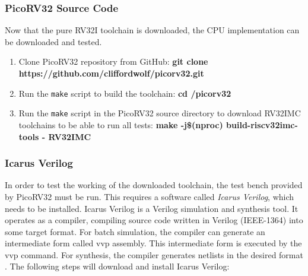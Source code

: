 \subsubsection{PicoRV32 Source Code}
 \label{sect6_3_2_2}
Now that the pure RV32I toolchain is downloaded, the CPU implementation can be downloaded and tested.

\begin{enumerate}
\item Clone PicoRV32 repository from GitHub: \newline
\small \textbf{git clone https://github.com/cliffordwolf/picorv32.git}

\item Run the \verb|make| script to build the toolchain:\newline
\small \textbf{cd \texttildelow /picorv32}

\item Run the \verb|make| script in the PicoRV32 source directory to download RV32IMC toolchains to be able to run all tests:\newline
\small \textbf{make -j\$(nproc) build-riscv32imc-tools - RV32IMC}

\end{enumerate}

\subsubsection{Icarus Verilog}
\label{sect6_3_2_3}
In order to test the working of the downloaded toolchain, the test bench provided by PicoRV32 must be run. This requires a software called \textit{Icarus Verilog}, which needs to be installed. Icarus Verilog is a Verilog simulation and synthesis tool. It operates as a compiler, compiling source code written in Verilog (IEEE-1364) into some target format. For batch simulation, the compiler can generate an intermediate form called vvp assembly. This intermediate form is executed by the vvp command. For synthesis, the compiler generates netlists in the desired format \cite{iverilog_wil}. The following steps will download and install Icarus Verilog:

